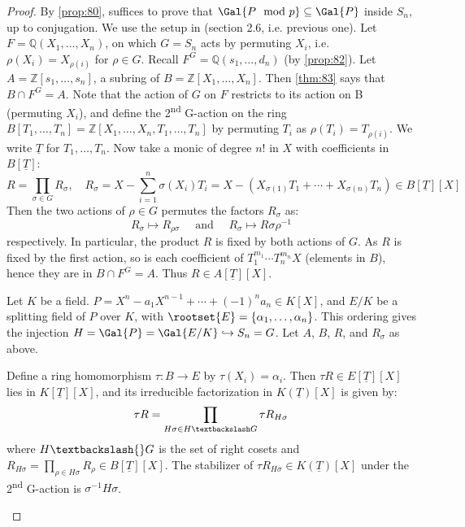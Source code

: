 \begin{proof}
  By \autoref{prop:80}, suffices to prove that $\Gal{P \mod p} \subseteq \Gal{P}$ inside $S_n$, up to conjugation. We use the setup in (section 2.6, i.e. previous one). Let $F = \mathbb{Q}(X_1, \ldots, X_n)$, on which $G = S_n$ acts by permuting $X_i$, i.e. $\rho(X_i) = X_{\rho(i)}$ for $\rho \in G$. Recall $F^G = \mathbb{Q}(s_1, \ldots, d_n)$ (by \autoref{prop:82}). Let $A = \mathbb{Z}[s_1, \ldots, s_n]$, a subring of $B = \mathbb{Z}[X_1, \ldots, X_n]$. Then \autoref{thm:83} says that $B \cap F^G = A$. Note that the action of $G$ on $F$ restricts to its action on B (permuting $X_i$), and define the 2\textsuperscript{nd} G-action on the ring $B[T_1, \ldots, T_n] = \mathbb{Z}[X_1, \ldots, X_n, T_1, \ldots, T_n]$ by permuting $T_i$ as $\rho(T_i) = T_{\rho(i)}$. We write $\underline{T}$ for $T_1, \ldots, T_n$. Now take a monic of degree $n!$ in $X$ with coefficients in $B[\underline{T}]$:
\[
R = \prod_{\sigma \in G}R_\sigma, \quad R_\sigma = X - \sum_{i=1}^n\sigma(X_i)T_i = X-(X_{\sigma(1)}T_1 + \cdots + X_{\sigma(n)}T_n) \in B[\underline{T}][X]
\]
Then the two actions of $\rho \in G$ permutes the factors $R_\sigma$ as:
\[
R_\sigma \mapsto R_{\rho\sigma} \quad \text{ and } \quad R_\sigma \mapsto R{\sigma\rho^{-1}}
\]
respectively. In particular, the product $R$ is fixed by both actions of $G$. As $R$ is fixed by the first action, so is each coefficient of $T_1^{m_1}\cdots{}T_n^{m_n}X$ (elements in $B$), hence they are in $B \cap F^G = A$. Thus $R \in A[\underline{T}][X]$.

\begin{lemma}
  \label{lemma:85}
  Let $K$ be a field. $ P = X^n - a_1X^{n-1} + \cdots + (-1)^na_n \in K[X]$, and $E/K$ be a splitting field of $P$ over $K$, with $\rootset{E} = \{ \alpha_1, \ldots, \alpha_n \}$. This ordering gives the injection $H = \Gal{P} = \Gal{E/K} \hookrightarrow S_n = G$. Let $A$, $B$, $R$, and $R_\sigma$ as above.

Define a ring homomorphism $\tau : B \rightarrow E$ by $\tau(X_i) = \alpha_i$. Then $\tau{}R \in E[\underline{T}][X]$ lies in $K[\underline{T}][X]$, and its irreducible factorization in $K(\underline{T})[X]$ is given by:
\[
\tau{}R  = \prod_{H\sigma \in H \textbackslash G} \tau{}R_{H\sigma}
\]
where $H\textbackslash{}G$ is the set of right cosets and $R_{H\sigma} = \prod_{\rho \in H\sigma} R_\rho \in B[\underline{T}][X]$. The stabilizer of $\tau{}R_{H\sigma} \in K(\underline{T})[X]$ under the 2\textsuperscript{nd} G-action is $\sigma^{-1}H\sigma$.
\end{lemma}


\end{proof}
